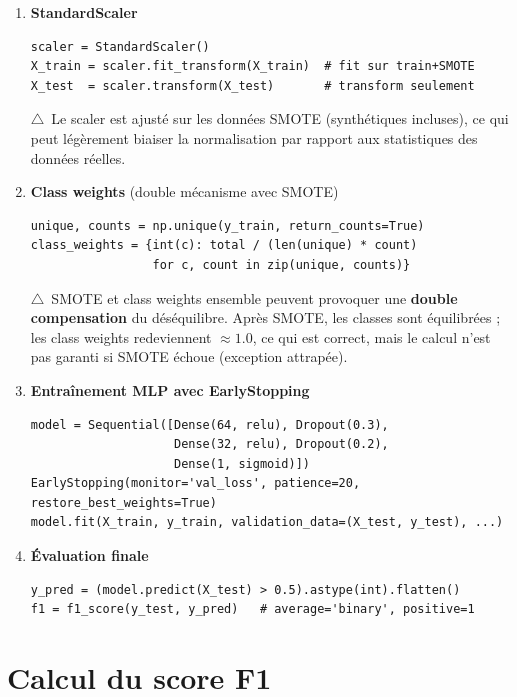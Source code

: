 \documentclass[11pt,a4paper]{article}
\newcommand{\warn}{{\color{warnborder}$\triangle$}}
\begin{document}
\begin{enumerate}[leftmargin=*, label=\textbf{\arabic{*}.}]
\item \textbf{StandardScaler}
\begin{lstlisting}
scaler = StandardScaler()
X_train = scaler.fit_transform(X_train)  # fit sur train+SMOTE
X_test  = scaler.transform(X_test)       # transform seulement
\end{lstlisting}
\begin{warnbox}
\warn~Le scaler est ajusté sur les données SMOTE (synthétiques incluses),
ce qui peut légèrement biaiser la normalisation par rapport
aux statistiques des données réelles.
\end{warnbox}

\item \textbf{Class weights} (double mécanisme avec SMOTE)
\begin{lstlisting}
unique, counts = np.unique(y_train, return_counts=True)
class_weights = {int(c): total / (len(unique) * count)
                 for c, count in zip(unique, counts)}
\end{lstlisting}
\begin{warnbox}
\warn~SMOTE et class weights ensemble peuvent provoquer une
\textbf{double compensation} du déséquilibre. Après SMOTE, les classes sont
équilibrées ; les class weights redeviennent $\approx1.0$, ce qui est correct,
mais le calcul n'est pas garanti si SMOTE échoue (exception attrapée).
\end{warnbox}

\item \textbf{Entraînement MLP avec EarlyStopping}
\begin{lstlisting}
model = Sequential([Dense(64, relu), Dropout(0.3),
                    Dense(32, relu), Dropout(0.2),
                    Dense(1, sigmoid)])
EarlyStopping(monitor='val_loss', patience=20, restore_best_weights=True)
model.fit(X_train, y_train, validation_data=(X_test, y_test), ...)
\end{lstlisting}

\item \textbf{Évaluation finale}
\begin{lstlisting}
y_pred = (model.predict(X_test) > 0.5).astype(int).flatten()
f1 = f1_score(y_test, y_pred)   # average='binary', positive=1
\end{lstlisting}

\end{enumerate}

\section{Calcul du score F1}
\end{document}
